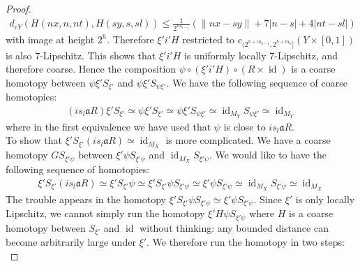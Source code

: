\documentclass[a4paper,11pt]{article}
\theoremstyle{definition}
\theoremstyle{plain}
\theoremstyle{remark}
\DeclareMathOperator{\id}{id}
\begin{document}
{\begin{proof}
\begin{align*}
d_{cY}(H(nx,n,nt),H(sy,s,sl)) \leq \frac{1}{2^{m_{h-1}}}(\|nx-sy\| + 7|n-s| + 4|nt-sl|)
\end{align*}
with image at height $2^{h}$. Therefore $\xi' i' H$ restricted to $c_{(2^{h+m_{h-1}},2^{h+m_{h}}]}(Y\times [0,1])$ is also $7$-Lipschitz. This shows that $\xi' i' H$ is uniformly locally $7$-Lipschitz, and therefore coarse. Hence the composition $\psi \circ (\xi' i' H)\circ (R\times \id)$ is a coarse homotopy between $\psi \xi' S_{\xi'}$ and $\psi \xi' S_{\psi \xi'}$. We have the following sequence of coarse homotopies:
\begin{align*}
(is_{l}\mathfrak{a}R) \xi' S_{\xi'} \simeq \psi \xi' S_{\xi'} \simeq \psi \xi' S_{\psi \xi'} \simeq \id_{M_{Y}} S_{\psi \xi'} \simeq \id_{M_{Y}}
\end{align*}
where in the first equivalence we have used that $\psi$ is close to $is_{l}\mathfrak{a} R$.\\

 To show that $ \xi' S_{\xi'} (is_{l}\mathfrak{a}R) \simeq \id_{M_{X}}$ is more complicated. 
We have a coarse homotopy $GS_{\xi' \psi}$ between $\xi' \psi S_{\xi' \psi}$ and $\id_{M_{X}} S_{\xi' \psi}$. We would like to have the following sequence of homotopies:
\begin{align*}
 \xi' S_{\xi'} (is_{l}\mathfrak{a}R) \simeq   \xi' S_{\xi'} \psi \simeq \xi' S_{\xi'} \psi S_{\xi' \psi} \simeq \xi' \psi S_{\xi' \psi} \simeq \id_{M_{X}} S_{\xi' \psi} \simeq \id_{M_{X}}
\end{align*}
The trouble appears in the homotopy $ \xi' S_{\xi'} \psi S_{\xi' \psi} \simeq \xi' \psi S_{\xi' \psi}$. Since $\xi'$ is only locally Lipschitz, we cannot simply run the homotopy $\xi' H \psi S_{\xi' \psi}$ where $H$ is a coarse homotopy between $S_{\xi'}$ and $\id$ without thinking: any bounded distance can become arbitrarily large under $\xi'$. We therefore run the homotopy in two steps:\\


\end{proof}}
\end{document}
